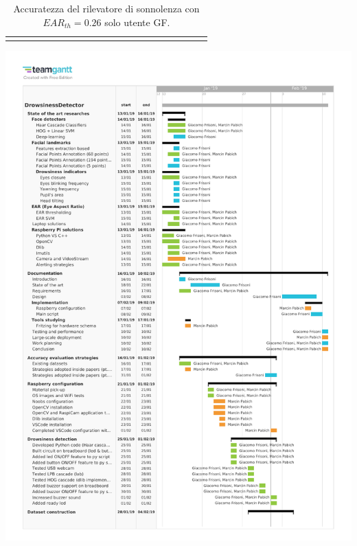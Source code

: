 \documentclass[12pt]{article}
\begin{document}
\begin{landscape}
\begin{table}[]
\begin{adjustbox}{width=1.4\textwidth}
\begin{tabular}{lllllllllllllllccllll}
				& & & & & & & & & & & & & & & \multicolumn{1}{l}{} & \multicolumn{1}{l}{} & & & &
			\end{tabular}
		\end{adjustbox}
		\caption{Accuratezza del rilevatore di sonnolenza con $EAR_{th}=0.26$ solo utente GF.}
		\label{table:gf_ear_26}
	\end{table}
\end{landscape}

%


\thispagestyle{empty}
{%
	\centering
	\includegraphics[page=2,scale=.95]{pdf/drowsiness_detector_gantt.pdf}
	\par
}

\restoregeometry
\end{document}
